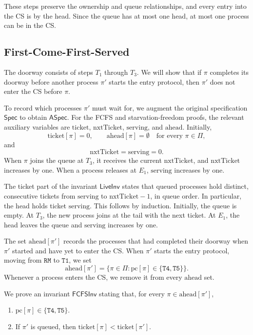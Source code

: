 \documentclass[12pt]{amsproc}
\begin{document}
These steps preserve the ownership and queue relationships, and every entry into the CS is by the head. Since the queue has at most one head, at most one process can be in the CS.

\subsection{First-Come-First-Served}

\bbni

The doorway consists of steps $T_1$ through $T_3$. We will show that if $\pi$ completes its doorway before another process $\pi'$ starts the entry protocol, then $\pi'$ does not enter the CS before $\pi$. 

To record which processes $\pi'$ must wait for, we augment the original specification $\mathsf{Spec}$ to obtain $\mathsf{ASpec}$. For the FCFS and starvation-freedom proofs, the relevant auxiliary variables are $\mathrm{ticket}$, $\mathrm{nxtTicket}$, $\mathrm{serving}$, and $\mathrm{ahead}$. Initially,
\[
    \mathrm{ticket}[\pi]=0,\qquad
    \mathrm{ahead}[\pi]=\emptyset
    \quad\text{for every }\pi\in\Pi,
\]
and
\[
    \mathrm{nxtTicket}=\mathrm{serving}=0.
\]
When $\pi$ joins the queue at $T_3$, it receives the current $\mathrm{nxtTicket}$, and $\mathrm{nxtTicket}$ increases by one. When a process releases at $E_1$, $\mathrm{serving}$ increases by one.

The ticket part of the invariant $\mathsf{LiveInv}$ states that queued processes hold distinct, consecutive tickets from $\mathrm{serving}$ to $\mathrm{nxtTicket}-1$, in queue order. In particular, the head holds ticket $\mathrm{serving}$. This follows by induction. Initially, the queue is empty. At $T_3$, the new process joins at the tail with the next ticket. At $E_1$, the head leaves the queue and $\mathrm{serving}$ increases by one.

The set $\mathrm{ahead}[\pi']$ records the processes that had completed their doorway when $\pi'$ started and have yet to enter the CS. When $\pi'$ starts the entry protocol, moving from $\texttt{RM}$ to $\texttt{T1}$, we set
\[
    \mathrm{ahead}[\pi']
    =
    \{\pi\in\Pi:
        \mathrm{pc}[\pi]\in\{\texttt{T4},\texttt{T5}\}\}.
\]
Whenever a process enters the CS, we remove it from every $\mathrm{ahead}$ set. 

We prove an invariant $\mathsf{FCFSInv}$ stating that, for every $\pi\in\mathrm{ahead}[\pi']$,
\begin{enumerate}
    \item $\mathrm{pc}[\pi]\in\{\texttt{T4},\texttt{T5}\}$.
    \item If $\pi'$ is queued, then
    $\mathrm{ticket}[\pi]<\mathrm{ticket}[\pi']$.
\end{enumerate}
\end{document}
